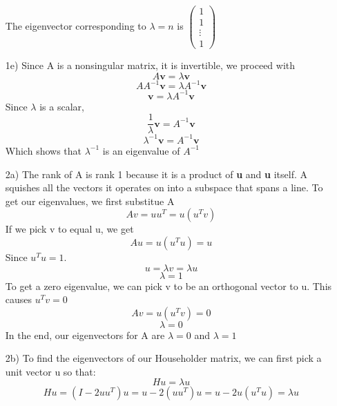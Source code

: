\documentclass{article}
\begin{document}
\begin{enumerate}
            The eigenvector corresponding to $\lambda = n$ is $\begin{pmatrix}
                1 \\ 1 \\ \vdots \\ 1
            \end{pmatrix} $
    \item[1e)] Since A is a nonsingular matrix, it is invertible, we proceed with
                $$A\textbf{v} = \lambda \textbf{v}$$
                $$AA^{-1}\textbf{v} = \lambda A^{-1}\textbf{v}$$
                $$\textbf{v} = \lambda A^{-1}\textbf{v}$$
                Since $\lambda$ is a scalar,
                $$\frac{1}{\lambda}\textbf{v} = A^{-1}\textbf{v}$$ 
                $$\lambda^{-1}\textbf{v} = A^{-1}\textbf{v}$$
            Which shows that $\lambda^{-1}$ is an eigenvalue of $A^{-1}$
    \item[2a)] The rank of A is rank 1 because it is a product of \textbf{u} and \textbf{u} itself. A squishes all the vectors it operates on into a subspace that spans a line. To get our eigenvalues, we first substitue A
                $$Av = uu^T = u(u^Tv)$$
            If we pick v to equal u, we get
                $$Au = u(u^Tu) = u$$
                Since $u^Tu = 1$. 
                $$u = \lambda v = \lambda u $$
                $$\lambda = 1$$
            To get a zero eigenvalue, we can pick v to be an orthogonal vector to u. This causes $u^Tv = 0$
                $$Av = u(u^Tv) = 0$$
                $$\lambda = 0$$
            In the end, our eigenvectors for A are $\lambda = 0$ and $\lambda = 1$
    \item[2b)] 
            To find the eigenvectors of our Householder matrix, we can first pick a unit vector u so that:
                $$Hu = \lambda u$$
                $$Hu = (I - 2uu^T)u = u - 2(uu^T)u = u - 2u(u^Tu) = \lambda u$$

\end{enumerate}
\end{document}
